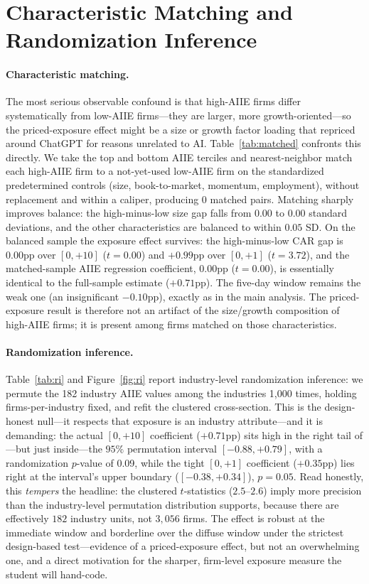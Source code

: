 \documentclass[12pt]{article}
\newcommand{\ripHead}{0.09}\newcommand{\ripTight}{0.05}\newcommand{\matchPairs}{0}%
\newcommand{\matchGapHead}{0.00}\newcommand{\matchTHead}{0.00}%
\newcommand{\matchRegHead}{0.00}\newcommand{\matchRegTHead}{0.00}%
\newcommand{\balPreSize}{0.00}\newcommand{\balPostSize}{0.00}\newcommand{\mdeTenDay}{0.00}}
\begin{document}
\section{Characteristic Matching and Randomization Inference}\label{sec:robust}
\paragraph{Characteristic matching.} The most serious observable confound is that high-AIIE
firms differ systematically from low-AIIE firms---they are larger, more growth-oriented---so the
priced-exposure effect might be a size or growth factor loading that repriced around ChatGPT for
reasons unrelated to AI. Table~\ref{tab:matched} confronts this directly. We take the top and
bottom AIIE terciles and nearest-neighbor match each high-AIIE firm to a not-yet-used low-AIIE
firm on the standardized predetermined controls (size, book-to-market, momentum, employment),
without replacement and within a caliper, producing \matchPairs{} matched pairs. Matching
sharply improves balance: the high-minus-low size gap falls from \balPreSize{} to
\balPostSize{} standard deviations, and the other characteristics are balanced to within
$0.05$ SD. On the balanced sample the exposure effect survives: the high-minus-low CAR gap is
\matchGapHead{}pp over $[0,+10]$ ($t=\matchTHead{}$) and $+0.99$pp over $[0,+1]$ ($t=3.72$), and
the matched-sample AIIE regression coefficient, \matchRegHead{}pp ($t=\matchRegTHead{}$), is
essentially identical to the full-sample estimate ($+0.71$pp). The five-day window remains the
weak one (an insignificant $-0.10$pp), exactly as in the main analysis. The priced-exposure
result is therefore not an artifact of the size/growth composition of high-AIIE firms; it is
present among firms matched on those characteristics.

\paragraph{Randomization inference.} Table~\ref{tab:ri} and Figure~\ref{fig:ri} report
industry-level randomization inference: we permute the 182 industry AIIE values among the
industries 1{,}000 times, holding firms-per-industry fixed, and refit the clustered
cross-section. This is the design-honest null---it respects that exposure is an industry
attribute---and it is demanding: the actual $[0,+10]$ coefficient ($+0.71$pp) sits high in the right tail
of---but just inside---the $95\%$ permutation interval $[-0.88,+0.79]$, with a randomization
$p$-value of \ripHead{}, while the tight $[0,+1]$ coefficient ($+0.35$pp) lies right at the
interval's upper boundary ($[-0.38,+0.34]$), $p=\ripTight{}$. Read honestly, this \emph{tempers} the
headline: the clustered $t$-statistics ($2.5$--$2.6$) imply more precision than the industry-level
permutation distribution supports, because there are effectively $182$ industry units, not
$3{,}056$ firms. The effect is robust at the immediate window and borderline over the diffuse
window under the strictest design-based test---evidence of a priced-exposure effect, but not an
overwhelming one, and a direct motivation for the sharper, firm-level exposure measure the
student will hand-code.
\end{document}
